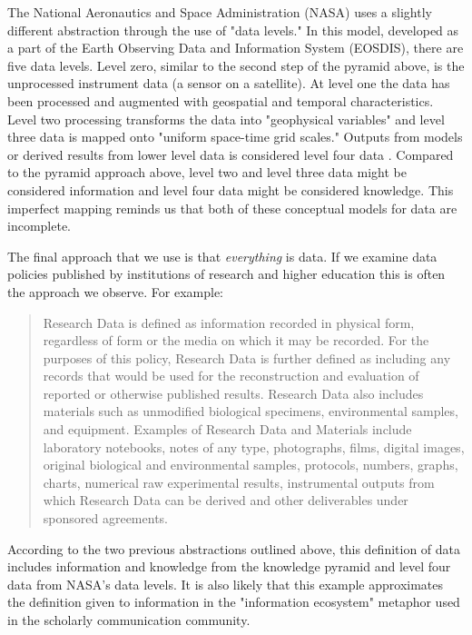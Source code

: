 The National Aeronautics and Space Administration (NASA) uses a slightly different abstraction through the use of "data levels." In this model, developed as a part of the Earth Observing Data and Information System (EOSDIS), there are five data levels. Level zero, similar to the second step of the pyramid above, is the unprocessed instrument data (a sensor on a satellite). At level one the data has been processed and augmented with geospatial and temporal characteristics. Level two processing transforms the data into "geophysical variables" and level three data is mapped onto "uniform space-time grid scales." Outputs from models or derived results from lower level data is considered level four data \citep{nasa_2010}. Compared to the pyramid approach above, level two and level three data might be considered information and level four data might be considered knowledge. This imperfect mapping reminds us that both of these conceptual models for data are incomplete.

The final approach that we use is that \textit{everything} is data. If we examine data policies published by institutions of research and higher education this is often the approach we observe. For example: 

\begin{quote}
Research Data is defined as information recorded in physical form, regardless of form or the media on which it may be recorded. For the purposes of this policy, Research Data is further defined as including any records that would be used for the reconstruction and evaluation of reported or otherwise published results. Research Data also includes materials such as unmodified biological specimens, environmental samples, and equipment. Examples of Research Data and Materials include laboratory notebooks, notes of any type, photographs, films, digital images, original biological and environmental samples, protocols, numbers, graphs, charts, numerical raw experimental results, instrumental outputs from which Research Data can be derived and other deliverables under sponsored agreements. \citep{jhu_2008}
\end{quote}

According to the two previous abstractions outlined above, this definition of data includes information and knowledge from the knowledge pyramid and level four data from NASA's data levels. It is also likely that this example approximates the definition given to information in the "information ecosystem" metaphor used in the scholarly communication community.
